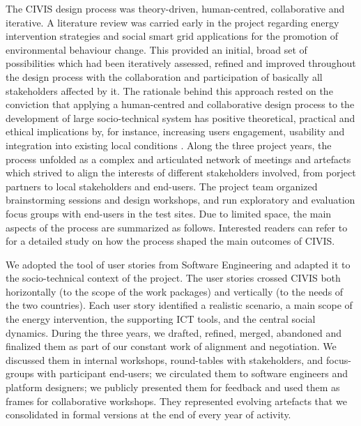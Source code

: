 The CIVIS design process was theory-driven, human-centred, collaborative and iterative. A
literature review was carried early in the project regarding energy intervention strategies and social smart
grid applications for the promotion of environmental behaviour change. This provided an initial, broad set
of possibilities which had been iteratively assessed, refined and improved throughout the design process with the collaboration and participation of basically all stakeholders affected by it.
% 
The rationale behind this approach rested on the conviction that applying a human-centred and
collaborative design process to the development of large socio-technical system has positive
theoretical, practical and ethical implications \cite{Greenbaum1993,Boedker2004} by, for instance, increasing users engagement,
usability and integration into existing local conditions \cite{Brynjarsdottir2012,Dick2012,Pierce2012}.
% 
Along the three project years, the process unfolded as a complex and articulated network of meetings and artefacts
which strived to align the interests of different stakeholders involved, from porject partners to
local stakeholders and end-users. The project team organized brainstorming sessions and design workshops, and run exploratory and evaluation focus groups with end-users in the test sites.
Due to limited space, the main aspects of the process are summarized as follows. Interested readers can refer to
\cite{poderi_disentangling_2017} for a detailed study on how the process shaped the main
outcomes of CIVIS. %


We adopted the tool of user stories \cite{Kankainen2012} from Software Engineering and adapted it to the socio-technical context of the project. The user stories crossed CIVIS both horizontally (to the
scope of the work packages) and vertically (to the needs of the two countries). Each user
story identified a realistic scenario, a main scope of the energy intervention, the supporting ICT tools,
and the central social dynamics. During the three years, we drafted, refined, merged, abandoned and
finalized them as part of our constant work of alignment and negotiation. We discussed them in internal
workshops, round-tables with stakeholders, and focus-groups with participant end-users; we circulated
them to software engineers and platform designers; we publicly presented them for feedback and used them
as frames for collaborative workshops. They represented evolving artefacts that we consolidated in formal
versions at the end of every year of activity. 

